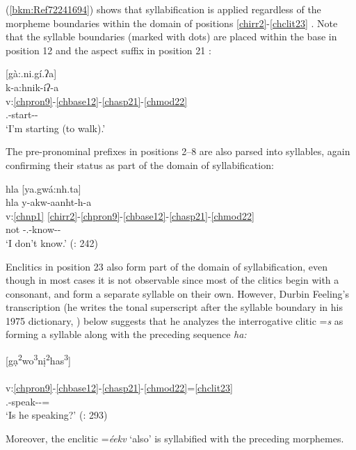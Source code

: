 \documentclass[output=paper]{langscibook}
\begin{document}
(\ref{bkm:Ref72241694}) shows that syllabification is applied regardless of the morpheme boundaries within the domain of positions \ref{chirr2}-\ref{chclit23} . Note that the syllable boundaries (marked with dots) are placed within the base in position 12 and the aspect suffix in position 21 :

\newpage
\ea\label{bkm:Ref72241694}[gà:.ni.gí.ʔa] \\
\glll k-a:hnik-íʔ-a\\
v:\ref{chpron9}-\ref{chbase12}-\ref{chasp21}-\ref{chmod22}\\
\First\Sg.\Aarg{}-start-\Prs{}-\Ind{}\\
\glt `I'm starting (to walk).' \citep[25]{Feeling1975}
\z 

The pre-pronominal prefixes in positions  2–8 are also parsed into syllables, again confirming their status as part of the domain of syllabification:

\ea\label{x:key:41} {hla [ya.gwá:nh.ta]} \\
\glll hla y-akw-aanht-h-a \\
v:\ref{chnp1} \ref{chirr2}-\ref{chpron9}-\ref{chbase12}-\ref{chasp21}-\ref{chmod22}\\
not \Irr{}-\First\Sg.\Barg{}-know-\Stat{}-\Ind{}\\
\glt `I don't know.' (\citealt{PulteFeeling1975}: 242)
\z 

Enclitics in position 23 also form part of the domain of syllabification, even though in most cases it is not observable since most of the clitics begin with a consonant, and form a separate syllable on their own. However, Durbin Feeling's transcription (he writes the tonal superscript after the syllable boundary in his 1975 dictionary, \citealt{PulteFeeling1975}) below suggests that he analyzes the interrogative clitic =\textit{s} as forming a syllable along with the preceding sequence \textit{ha:}

\ea\label{ex:cher:key:42} {[gạ\textsuperscript{2}wo\textsuperscript{3}nị\textsuperscript{2}has\textsuperscript{3}]} \\
\\
v:\ref{chpron9}-\ref{chbase12}-\ref{chasp21}-\ref{chmod22}=\ref{chclit23}\\
\Third\Sg.\Aarg{}-speak-\Prs{}-\Ind{}=\Q{}\\
\glt `Is he speaking?' (\citealt{PulteFeeling1975}: 293)
\z 


Moreover, the enclitic =\textit{éekv} `also' is syllabified with the preceding morphemes. 
\end{document}
